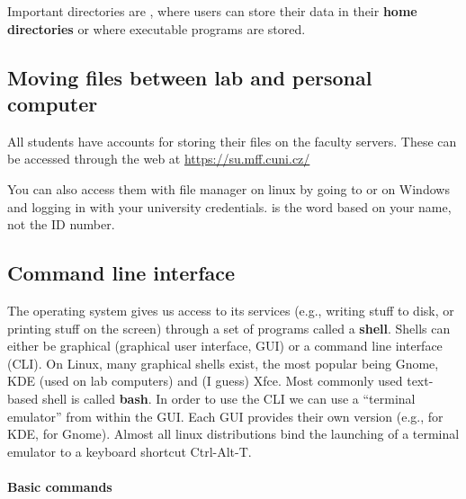 Important directories are , where users can store their data in their \textbf{home directories} or  where executable programs are stored.

\subsection{Moving files between lab and personal computer}

All students have accounts for storing their files on the faculty servers. These can be accessed through the web at \url{https://su.mff.cuni.cz/}

You can also access them with file manager on linux by going to or  on Windows and logging in with your university credentials.  is the word based on your name, not the ID number.

\subsection{Command line interface}

The operating system gives us access to its services (e.g., writing stuff to disk, or printing stuff on the screen) through a set of programs called a \textbf{shell}. Shells can either be graphical (graphical user interface, GUI) or a command line interface (CLI). On Linux, many
graphical shells exist, the most popular being Gnome, KDE (used on lab computers) and (I guess) Xfce. Most commonly used text-based shell is called \textbf{bash}. In order to use the CLI we can use a ``terminal emulator'' from within the GUI. Each GUI provides their own version
(e.g.,  for KDE,  for Gnome). Almost all linux distributions bind the launching of a terminal emulator to a keyboard shortcut Ctrl-Alt-T.

\paragraph{Basic commands}

